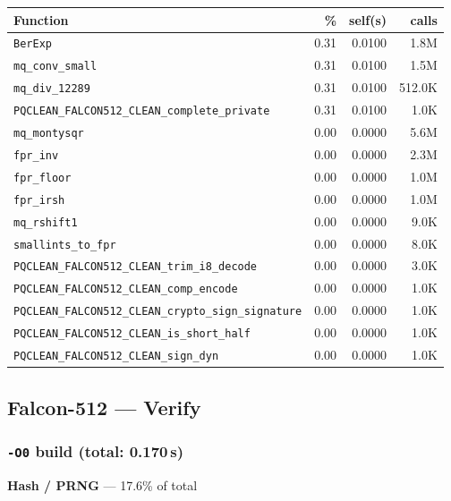 \documentclass[11pt,a4paper]{article}
\begin{document}
\begin{longtable}{p{7.5cm}rrr}
\toprule
Function & \% & self(s) & calls \\
\midrule
\endhead
  \texttt{BerExp} & 0.31 & 0.0100 & 1.8M \\
  \texttt{mq\_conv\_small} & 0.31 & 0.0100 & 1.5M \\
  \texttt{mq\_div\_12289} & 0.31 & 0.0100 & 512.0K \\
  \texttt{PQCLEAN\_FALCON512\_CLEAN\_complete\_private} & 0.31 & 0.0100 & 1.0K \\
  \texttt{mq\_montysqr} & 0.00 & 0.0000 & 5.6M \\
  \texttt{fpr\_inv} & 0.00 & 0.0000 & 2.3M \\
  \texttt{fpr\_floor} & 0.00 & 0.0000 & 1.0M \\
  \texttt{fpr\_irsh} & 0.00 & 0.0000 & 1.0M \\
  \texttt{mq\_rshift1} & 0.00 & 0.0000 & 9.0K \\
  \texttt{smallints\_to\_fpr} & 0.00 & 0.0000 & 8.0K \\
  \texttt{PQCLEAN\_FALCON512\_CLEAN\_trim\_i8\_decode} & 0.00 & 0.0000 & 3.0K \\
  \texttt{PQCLEAN\_FALCON512\_CLEAN\_comp\_encode} & 0.00 & 0.0000 & 1.0K \\
  \texttt{PQCLEAN\_FALCON512\_CLEAN\_crypto\_sign\_signature} & 0.00 & 0.0000 & 1.0K \\
  \texttt{PQCLEAN\_FALCON512\_CLEAN\_is\_short\_half} & 0.00 & 0.0000 & 1.0K \\
  \texttt{PQCLEAN\_FALCON512\_CLEAN\_sign\_dyn} & 0.00 & 0.0000 & 1.0K \\
\bottomrule
\end{longtable}

\subsection{Falcon-512 --- Verify}

\subsubsection*{\texttt{-O0} build (total: 0.170\,s)}

\noindent\colorbox{hashcolor}{\strut \textbf{Hash / PRNG} --- 17.6\% of total}
\vspace{2pt}
\end{document}
